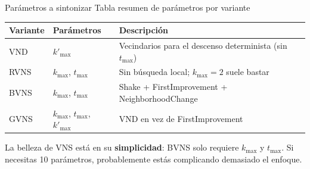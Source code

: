 \documentclass[aspectratio=169, 11pt, xcolor={dvipsnames,table}]{beamer}
\begin{document}
\begin{frame}{ Parámetros a sintonizar Tabla resumen de parámetros por variante}
\centering
\footnotesize
\setlength{\tabcolsep}{4pt}
\begin{tabular}{@{}p{1.5cm} p{2.8cm} p{8.5cm}@{}}
\toprule
\textbf{Variante} & \textbf{Parámetros} & \textbf{Descripción} \\
\midrule
VND  & $k'_{\max}$ & Vecindarios para el descenso determinista (sin $t_{\max}$) \\
RVNS & $k_{\max}$, $t_{\max}$ & Sin búsqueda local; $k_{\max}=2$ suele bastar \\
BVNS & $k_{\max}$, $t_{\max}$ & Shake + FirstImprovement + NeighborhoodChange \\
GVNS & $k_{\max}$, $t_{\max}$, $k'_{\max}$ & VND en vez de FirstImprovement \\
\bottomrule
\end{tabular}

\vspace{2pt}
\begin{ideaclave}
La belleza de VNS está en su \textbf{simplicidad}: BVNS solo requiere $k_{\max}$ y $t_{\max}$.
Si necesitas 10 parámetros, probablemente estás complicando demasiado el enfoque.
\end{ideaclave}
\end{frame}




\end{document}
